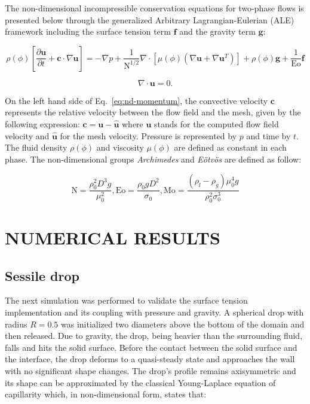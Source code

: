 \documentclass{wccm2014}
\newcommand{\uvet}{\mathbf{u}}
\newcommand{\cvet}{\mathbf{c}}
\newcommand{\Eo}{\mathrm{Eo}}
\newcommand{\N}{\mathrm{N}}
\newcommand{\Mo}{\mathrm{Mo}}
\begin{document}
The non-dimensional incompressible conservation equations for two-phase
flows is presented below through the generalized Arbitrary
Lagrangian-Eulerian (ALE) framework including the surface tension term
$\mathbf{f}$ and the gravity term $\mathbf{g}$: 

\begin{equation}
	\rho(\phi) [ \frac{\partial \uvet}{\partial t} 
	+ \cvet \cdot \nabla \uvet ]
	=
	- \nabla p 
	+ \frac{1}{\N^{1/2}} \nabla \cdot
	[\mu(\phi) ( \nabla \uvet + \nabla \uvet^T)]+
	\rho(\phi) \mathbf{g}+
	\frac{1}{\Eo} \mathbf{f}
	\label{eq:nd-momentum}
\end{equation}

\begin{equation}
	\nabla \cdot \uvet
	= 
	0.
\label{eq:nd-continuity} 
\end{equation}

On the left hand side of Eq.~\ref{eq:nd-momentum}, the convective velocity
$\cvet$ represents the relative velocity between the flow field and the
mesh, given by the following expression: $\cvet = \uvet - \hat{\uvet}$
where $\uvet$ stands for the computed flow field velocity and
$\hat{\uvet}$ for the mesh velocity. Pressure is represented by $p$ and
time by $t$. The fluid density $\rho(\phi)$ and viscosity $\mu(\phi)$
are defined as constant in each phase. The non-dimensional groups
\textit{Archimedes} and \textit{E\"otv\"os} are defined as follow:

\begin{equation}
 \N = \frac{\rho_0^2 D^3 g}{\mu_0^2},
 \Eo = \frac{\rho_0 g D^2}{\sigma_0},
 \Mo = \frac{(\rho_l-\rho_g)\mu_0^4 g}{\rho_{0}^2 \sigma_0^3} 
 \label{eq:nd-groups}
\end{equation}


\section{NUMERICAL RESULTS}
\label{sec:results}

\subsection{Sessile drop}
\label{sessile}
The next simulation was performed to validate the surface tension
implementation and its coupling with pressure and gravity. A spherical
drop with radius $R=0.5$ was initialized two diameters above the bottom
of the domain and then released. Due to gravity, the drop, being 
heavier than the surrounding fluid, falls and hits the solid surface.
Before the contact between the solid surface and the interface, the drop
deforms to a quasi-steady state and approaches the wall with no
significant shape changes. The drop's profile remains axisymmetric and
its shape can be approximated by the classical Young-Laplace equation of 
capillarity which, in non-dimensional form, states that:
\end{document}
